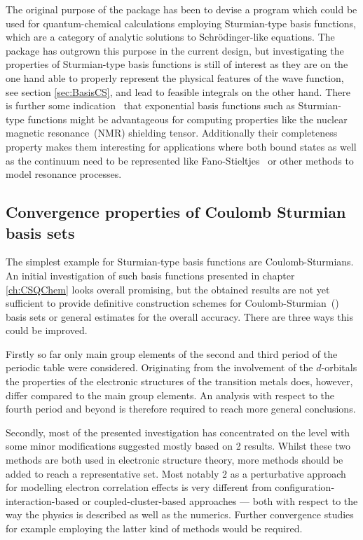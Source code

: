 The original purpose of the \molsturm package has been to devise a program
which could be used for quantum-chemical calculations
employing Sturmian-type basis functions,
which are a category of analytic solutions to Schrödinger-like equations.
The package has outgrown this purpose in the current design,
but investigating the properties of Sturmian-type basis functions is still of interest
as they are on the one hand able to properly represent
the physical features of the wave function,
see section \ref{sec:BasisCS},
and lead to feasible integrals on the other hand.
There is further some indication~\cite{Guell2008,Hoggan2009}
that exponential basis functions such as Sturmian-type functions
might be advantageous
for computing properties like the nuclear magnetic resonance~(NMR) shielding tensor.
Additionally their completeness property
makes them interesting for applications where both bound states
as well as the continuum need to be represented
like Fano-Stieltjes~\cite{Feshbach1958,Feshbach1962,Santra2002}
or other methods to model resonance processes.

\subsection{Convergence properties of Coulomb Sturmian basis sets}
The simplest example for Sturmian-type basis functions are Coulomb-Sturmians.
An initial investigation of such basis functions presented
in chapter \ref{ch:CSQChem} looks overall promising,
but the obtained results are not yet sufficient to provide definitive
construction schemes for Coulomb-Sturmian~(\CS) basis sets
or general estimates for the overall accuracy.
There are three ways this could be improved.

Firstly so far only main group elements of the second and third
period of the periodic table were considered.
Originating from the involvement of the $d$-orbitals
the properties of the electronic structures of the transition metals does, however,
differ compared to the main group elements.
An analysis with respect to the fourth period and beyond
is therefore required to reach more general conclusions.

Secondly, most of the presented investigation has concentrated on the \HF
level with some minor modifications suggested mostly based on {\MP}2 results.
Whilst these two methods are both used in electronic structure theory,
more methods should be added to reach a representative set.
Most notably {\MP}2 as a perturbative approach
for modelling electron correlation effects is very different from
configuration-interaction-based
or coupled-cluster-based approaches
--- both with respect to the way the physics is described
as well as the numerics.
Further convergence studies for example employing the latter kind of methods
would be required.

